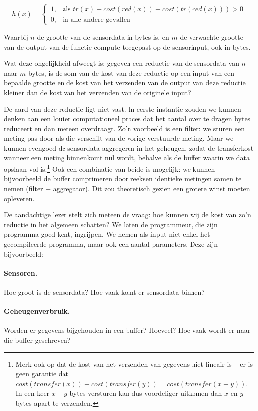 \documentclass{article}
\begin{document}
\[
h(x)= 
\begin{cases}
  1, & \text{als } tr(x) - cost(red(x)) - cost(tr(red(x))) > 0  \\
  0, & \text{in alle andere gevallen}
\end{cases}
\]

Waarbij $n$ de grootte van de sensordata in bytes is, en $m$ de verwachte
grootte van de output van de functie compute toegepast op de sensorinput, ook in
bytes.

Wat deze ongelijkheid afweegt is: gegeven een reductie van de sensordata van $n$ naar
$m$ bytes, is de som van de kost van deze reductie op een input van een bepaalde
grootte en de kost van het verzenden van de output van deze reductie kleiner dan
de kost van het verzenden van de originele input?

De aard van deze reductie ligt niet vast. In eerste instantie zouden we kunnen
denken aan een louter computationeel proces dat het aantal over te dragen bytes
reduceert en dan meteen overdraagt. Zo'n voorbeeld is een filter: we sturen een
meting pas door als die verschilt van de vorige verstuurde meting. Maar we
kunnen evengoed de sensordata aggregeren in het geheugen, zodat de transferkost
wanneer een meting binnenkomt nul wordt, behalve als de buffer waarin we data
opslaan vol is.\footnote{Merk ook op dat de kost van het verzenden van gegevens
niet lineair is -- er is geen garantie dat $cost(transfer(x)) +
cost(transfer(y)) = cost(transfer(x + y))$. In een keer $x + y$ bytes versturen
kan dus voordeliger uitkomen dan $x$ en $y$ bytes apart te verzenden.} 
Ook een combinatie van beide is mogelijk: we kunnen bijvoorbeeld de buffer
comprimeren door reeksen identieke metingen samen te nemen (filter +
aggregator). Dit zou theoretisch gezien een grotere winst moeten opleveren.

De aandachtige lezer stelt zich meteen de vraag: hoe kunnen wij de kost van zo'n
reductie in het algemeen schatten? We laten de programmeur, die zijn programma
goed kent, ingrijpen. We nemen als input niet enkel het gecompileerde programma,
maar ook een aantal parameters. Deze zijn bijvoorbeeld:
\paragraph{Sensoren.} Hoe groot is de sensordata? Hoe vaak komt er sensordata binnen?
\paragraph{Geheugenverbruik.} Worden er gegevens bijgehouden in een buffer? Hoeveel? Hoe vaak wordt er naar die buffer geschreven?
\end{document}
